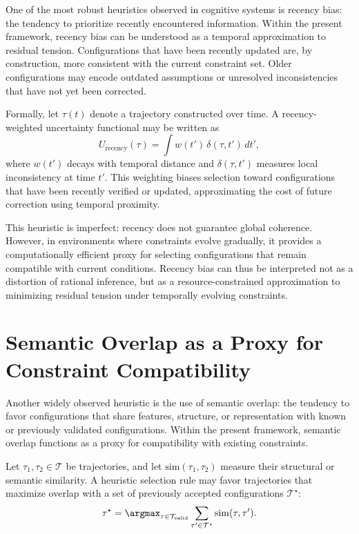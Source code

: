 \documentclass[11pt]{article}
\theoremstyle{plain}
\theoremstyle{definition}
\theoremstyle{remark}
\begin{document}
One of the most robust heuristics observed in cognitive systems is recency bias: the tendency to prioritize recently encountered information. Within the present framework, recency bias can be understood as a temporal approximation to residual tension. Configurations that have been recently updated are, by construction, more consistent with the current constraint set. Older configurations may encode outdated assumptions or unresolved inconsistencies that have not yet been corrected.

Formally, let $\tau(t)$ denote a trajectory constructed over time. A recency-weighted uncertainty functional may be written as
\[
U_{\mathrm{recency}}(\tau) = \int w(t') \, \delta(\tau, t') \, dt',
\]
where $w(t')$ decays with temporal distance and $\delta(\tau, t')$ measures local inconsistency at time $t'$. This weighting biases selection toward configurations that have been recently verified or updated, approximating the cost of future correction using temporal proximity.

This heuristic is imperfect: recency does not guarantee global coherence. However, in environments where constraints evolve gradually, it provides a computationally efficient proxy for selecting configurations that remain compatible with current conditions. Recency bias can thus be interpreted not as a distortion of rational inference, but as a resource-constrained approximation to minimizing residual tension under temporally evolving constraints.

\section{Semantic Overlap as a Proxy for Constraint Compatibility}

Another widely observed heuristic is the use of semantic overlap: the tendency to favor configurations that share features, structure, or representation with known or previously validated configurations. Within the present framework, semantic overlap functions as a proxy for compatibility with existing constraints.

Let $\tau_1, \tau_2 \in \mathcal{T}$ be trajectories, and let $\mathrm{sim}(\tau_1, \tau_2)$ measure their structural or semantic similarity. A heuristic selection rule may favor trajectories that maximize overlap with a set of previously accepted configurations $\mathcal{T}^\star$:
\[
\tau^\star = \argmax_{\tau \in \mathcal{T}_{\mathrm{valid}}} \sum_{\tau' \in \mathcal{T}^\star} \mathrm{sim}(\tau, \tau').
\]
\end{document}
